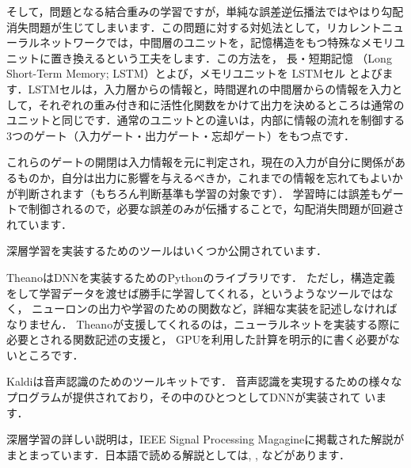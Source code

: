 そして，問題となる結合重みの学習ですが，単純な誤差逆伝播法ではやはり勾配消失問題が生じてしまいます．この問題に対する対処法として，リカレントニューラルネットワークでは，中間層のユニットを，記憶構造をもつ特殊なメモリユニットに置き換えるという工夫をします．この方法を，
長・短期記憶
（Long Short-Term Memory; LSTM）とよび，メモリユニットを
LSTMセル
とよびます．LSTMセルは，入力層からの情報と，時間遅れの中間層からの情報を入力として，それぞれの重み付き和に活性化関数をかけて出力を決めるところは通常のユニットと同じです．通常のユニットとの違いは，内部に情報の流れを制御する3つのゲート（入力ゲート・出力ゲート・忘却ゲート）をもつ点です．


これらのゲートの開閉は入力情報を元に判定され，現在の入力が自分に関係があるものか，自分は出力に影響を与えるべきか，これまでの情報を忘れてもよいかが判断されます（もちろん判断基準も学習の対象です）．
学習時には誤差もゲートで制御されるので，必要な誤差のみが伝播することで，勾配消失問題が回避されています．


深層学習を実装するためのツールはいくつか公開されています．

TheanoはDNNを実装するためのPythonのライブラリです．
ただし，構造定義をして学習データを渡せば勝手に学習してくれる，というようなツールではなく，
ニューロンの出力や学習のための関数など，詳細な実装を記述しなければなりません．
Theanoが支援してくれるのは，ニューラルネットを実装する際に必要とされる関数記述の支援と，
GPUを利用した計算を明示的に書く必要がないところです．

Kaldiは音声認識のためのツールキットです．
音声認識を実現するための様々なプログラムが提供されており，その中のひとつとしてDNNが実装されて
います．

深層学習の詳しい説明は，IEEE Signal Processing Magagineに掲載された解説\cite{hinton12}が
まとまっています．日本語で読める解説としては\cite{kubo13}, \cite{yasuda13}, \cite{aso13}などがあります．

